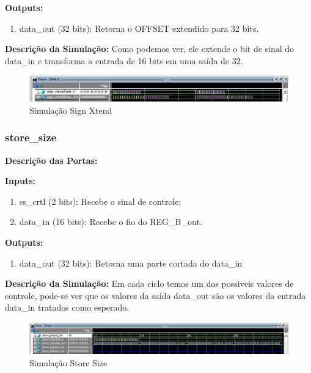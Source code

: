 \textbf{Outputs:}

\begin{enumerate}
    \item data\_out (32 bits): Retorna o OFFSET extendido para 32 bits.
\end{enumerate}

\textbf{Descrição da Simulação:} Como podemos ver, ele extende o bit de sinal do data\_in e transforma a entrada de 16 bits em uma saída de 32.

\begin{figure}[htbp!]
\centering
\includegraphics[width=1\textwidth]{figure/simulacao_sign_xtend.png}
\caption{Simulação Sign Xtend} 
\label{fig:imagem_massa}
\end{figure}

\subsubsection{store\_size}
\textbf{Descrição das Portas:}

\textbf{Inputs:}

\begin{enumerate}
    \item ss\_crtl (2 bits): Recebe o sinal de controle;
    \item data\_in (16 bits): Recebe o fio do REG\_B\_out.

\end{enumerate}

\textbf{Outputs:}

\begin{enumerate}
    \item data\_out (32 bits): Retorna uma parte cortada do data\_in
\end{enumerate}

\textbf{Descrição da Simulação:} Em cada ciclo temos um dos possiveis valores de controle, pode-se ver que os valores da saída data\_out são os valores da entrada data\_in tratados como esperado.

\begin{figure}[htbp!]
\centering
\includegraphics[width=1\textwidth]{figure/simulacao_store_size.png}
\caption{Simulação Store Size} 
\label{fig:imagem_massa}
\end{figure}

